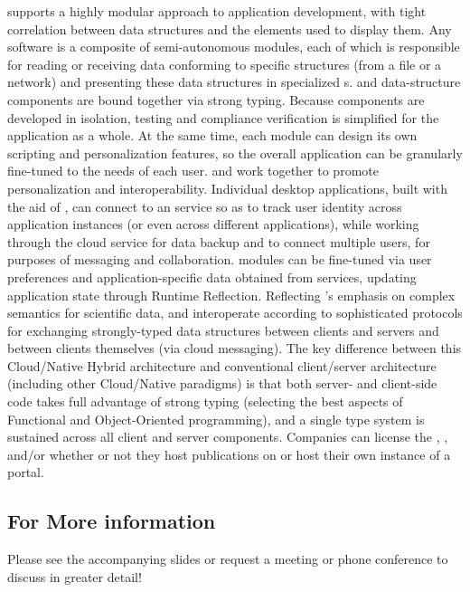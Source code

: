 \documentclass[11pt,letterpaper]{article}
\begin{document}
supports a highly modular approach to 
application development, with tight 
correlation between data structures and the {\GUI} 
elements used to display them.  Any {\VersatileUX} 
software is a composite of semi-autonomous  
modules, each of which is responsible for 
reading or receiving data conforming 
to specific structures (from a file or a network) 
and presenting these data structures in specialized 
{\GUI}s.  {\lfGUI} and data-structure components are 
bound together via strong typing.  Because {\VersatileUX} 
components are developed in isolation, testing and 
compliance verification is simplified for the application 
as a whole.  At the same time, each {\VersatileUX} 
module can design its own scripting and personalization 
features, so the overall application can be 
granularly fine-tuned to the needs of each user.
\p{}
{\NDPCloud} and {\VersatileUX} work together to 
promote personalization and interoperability.  
Individual desktop applications, built 
with the aid of {\VersatileUX}, can connect to an 
{\NDPCloud} service so as to track user identity across 
application instances (or even across different applications), 
while working through the cloud service for data backup and 
to connect multiple users, for purposes of 
messaging and collaboration.  
{\VersatileUX} modules can be fine-tuned via 
user preferences and application-specific data obtained from 
{\NDPCloud} services, updating application state through  
Runtime Reflection.  Reflecting {\MOSAIC}'s 
emphasis on complex semantics for scientific data, 
{\NDPCloud} and {\VersatileUX} interoperate according to  
sophisticated protocols for exchanging 
strongly-typed data structures between clients and 
servers and between clients themselves (via cloud messaging).  
The key difference between this Cloud/Native Hybrid 
architecture and conventional client/server architecture 
(including other Cloud/Native paradigms) is that 
both server- and client-side code takes full advantage of 
strong typing (selecting the best aspects of 
Functional and Object-Oriented programming), 
and a single type system is 
sustained across all client and server components.
\p{}
Companies can license the {\MOSAIC} {\SDK}, {\VersatileUX}, and/or 
{\NDPCloud} whether or not they 
host publications on {\MOSAIC} or host their own instance 
of a {\MOSAIC} portal.

\subsection{For More information}
Please see the accompanying slides or request a meeting 
or phone conference to discuss {\MOSAIC} in greater detail!
\end{document}
